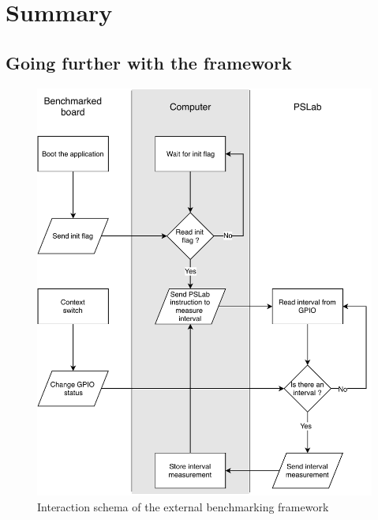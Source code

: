 \section{Summary}

\subsection{Going further with the framework}

\begin{figure}[!ht]
  \centering
  \includegraphics[scale=1]{assets/external-protocol.pdf}
  \caption{\label{fig:improve-framework-schema}Interaction schema of the external benchmarking framework}
\end{figure}